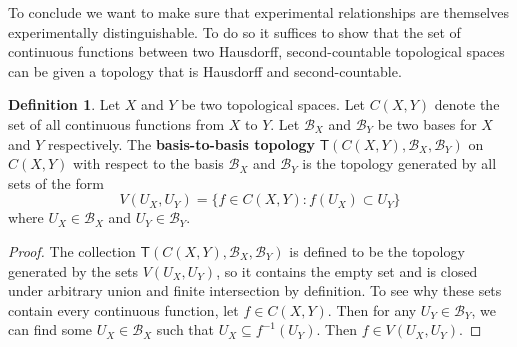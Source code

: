 \documentclass[preprint]{elsarticle}
\theoremstyle{plain}%
\theoremstyle{definition}
\newtheorem{defn}{Definition}[section]
\theoremstyle{remark}
\begin{document}
To conclude we want to make sure that experimental relationships are themselves experimentally distinguishable. To do so it suffices to show that the set of continuous functions between two Hausdorff, second-countable topological spaces can be given a topology that is Hausdorff and second-countable.

\begin{defn} Let $X$ and $Y$ be two topological spaces. Let $C(X,Y)$ denote the set of all continuous functions from $X$ to $Y$. Let $\mathcal{B}_X$ and $\mathcal{B}_Y$ be two bases for $X$ and $Y$ respectively. The \textbf{basis-to-basis topology} $\mathsf{T}(C(X,Y), \mathcal{B}_X, \mathcal{B}_Y)$ on $C(X,Y)$ with respect to the basis $\mathcal{B}_X$ and $\mathcal{B}_Y$ is the topology generated by all sets of the form 
	$$
	V(U_X, U_Y) = \{f\in C(X,Y) : f(U_X)\subset U_Y\}
	$$
where $U_X \in \mathcal{B}_X$ and $U_Y \in \mathcal{B}_Y$.
\end{defn}

\begin{proof}
	The collection $\mathsf{T}(C(X,Y), \mathcal{B}_X, \mathcal{B}_Y)$ is defined to be the topology generated by the sets $V(U_X,U_Y)$, so it contains the empty set and is closed under arbitrary union and finite intersection by definition. To see why these sets contain every continuous function, let $f\in C(X,Y)$. Then for any $U_Y\in \mathcal{B}_Y$, we can find some $U_X\in \mathcal{B}_X$ such that $U_X\subseteq f^{-1}(U_Y)$. Then $f\in V(U_X,U_Y)$.
\end{proof}
\end{document}
